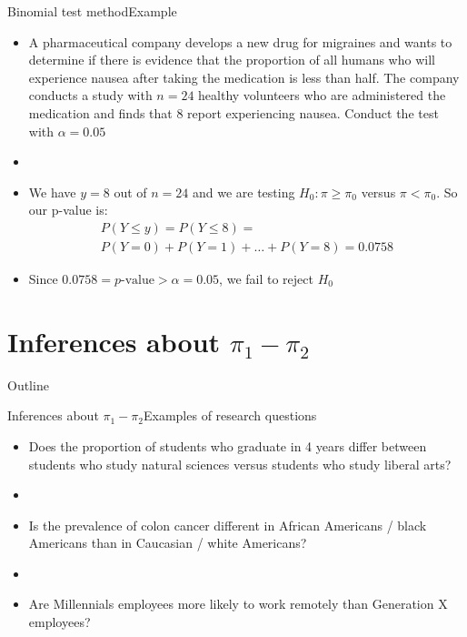 \documentclass[xcolor=dvipsnames]{beamer}
\begin{document}
\begin{frame}{Binomial test method}{Example}
	\begin{itemize}
		\item A pharmaceutical company develops a new drug for migraines and wants to determine if there is evidence that the proportion of all humans who will experience nausea after taking the medication is less than half. The company conducts a study with $n = 24$ healthy volunteers who are administered the medication and finds that 8 report experiencing nausea. Conduct the test with $\alpha = 0.05$
		\item[]
		\item We have $y = 8$ out of $n = 24$ and we are testing $H_0: \pi \geq \pi_0$ versus $\pi < \pi_0$. So our p-value is:
		\begin{gather*}
			P(Y \leq y) = P(Y \leq 8) = \\
			 P(Y = 0) + P(Y = 1) + \hdots + P(Y = 8) =0.0758
		\end{gather*}
		\item Since $0.0758 = p\text{-value} > \alpha = 0.05$, we fail to reject $H_0$
	\end{itemize}
\end{frame}

\section{Inferences about $\pi_1 - \pi_2$}

\begin{frame}{Outline}
	\tableofcontents[currentsection,subsectionstyle=show/shaded/hide]
\end{frame}

\begin{frame}{Inferences about $\pi_1 - \pi_2$}{Examples of research questions}
	\begin{itemize}
		\item Does the proportion of students who graduate in 4 years differ between students who study natural sciences versus students who study liberal arts?
		\item[]
		\item Is the prevalence of colon cancer different in African Americans / black Americans than in Caucasian / white Americans?
		\item[]
		\item Are Millennials employees more likely to work remotely than Generation X employees?
	\end{itemize}
\end{frame}
\end{document}
